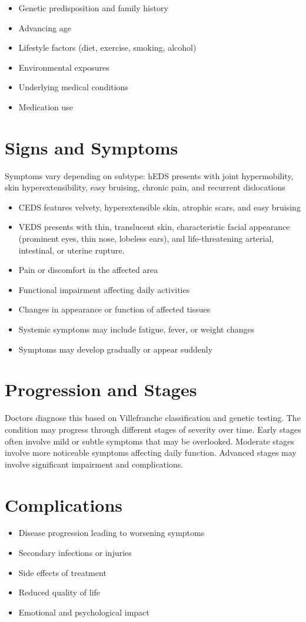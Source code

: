 \begin{itemize}[noitemsep]
  \item Genetic predisposition and family history
  \item Advancing age
  \item Lifestyle factors (diet, exercise, smoking, alcohol)
  \item Environmental exposures
  \item Underlying medical conditions
  \item Medication use
\end{itemize}
\section{Signs and Symptoms}
Symptoms vary depending on subtype: hEDS presents with joint hypermobility, skin hyperextensibility, easy bruising, chronic pain, and recurrent dislocations

\begin{itemize}[noitemsep]
  \item CEDS features velvety, hyperextensible skin, atrophic scars, and easy bruising
  \item VEDS presents with thin, translucent skin, characteristic facial appearance (prominent eyes, thin nose, lobeless ears), and life-threatening arterial, intestinal, or uterine rupture.
  \item Pain or discomfort in the affected area
  \item Functional impairment affecting daily activities
  \item Changes in appearance or function of affected tissues
  \item Systemic symptoms may include fatigue, fever, or weight changes
  \item Symptoms may develop gradually or appear suddenly
\end{itemize}
\section{Progression and Stages}
Doctors diagnose this based on Villefranche classification and genetic testing. The condition may progress through different stages of severity over time. Early stages often involve mild or subtle symptoms that may be overlooked. Moderate stages involve more noticeable symptoms affecting daily function. Advanced stages may involve significant impairment and complications.
\section{Complications}
\begin{itemize}[noitemsep]
  \item Disease progression leading to worsening symptoms
  \item Secondary infections or injuries
  \item Side effects of treatment
  \item Reduced quality of life
  \item Emotional and psychological impact
\end{itemize}
